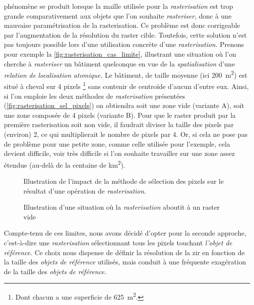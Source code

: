 phénomène se produit lorsque la maille utilisée pour la
\emph{rasterisation} est trop grande comparativement aux objets que
l'on souhaite \emph{rasteriser,} donc à une mauvaise paramétrisation
de la rasterisation. Ce problème est donc corrigeable par
l'augmentation de la résolution du raster cible. Toutefois, cette
solution n'est pas toujours possible lors d'une utilisation concrète
d'une \emph{rasterisation.} Prenons pour exemple la
\autoref{fig:rasterisation_cas_limite}, illustrant une situation où
l'on cherche à \emph{rasteriser} un bâtiment quelconque en vue de la
\emph{spatialisation} d'une \emph{relation de localisation atomique.}
Le bâtiment, de taille moyenne (ici \SI{200}{\metre\squared}) est
situé à cheval sur 4 pixels \footnote{Dont chacun a une superficie de
  \SI{625}{\metre\squared}.} sans contenir de centroïde d'aucun
d'entre eux. Ainsi, si l'on emploie les deux méthodes de
\emph{rasterisation} présentées
(\autoref{fig:rasterisation_sel_pixels}) on obtiendra soit une zone
vide (variante \textcolor{RdBu-9-1}{\textsf{A}}), soit une zone
composée de 4 pixels (variante \textcolor{RdBu-9-9}{\textsf{B}}). Pour
que le raster produit par la première rasterisation soit non vide, il
faudrait diviser la taille des pixels par (environ) 2, ce qui
multiplierait le nombre de pixels par 4. Or, si cela ne pose pas de
problème pour une petite zone, comme celle utilisée pour l'exemple,
cela devient difficile, voir très difficile si l'on souhaite
travailler sur une zone assez étendue (au-delà de la centaine de
\si{\kilo\meter\squared}).

\begin{figure}
  \centering
  
  \caption{Illustration de l'impact de la méthode de sélection des
    pixels sur le résultat d'une opération de \emph{rasterisation.}}
  \label{fig:rasterisation_sel_pixels}
\end{figure}

\begin{figure}
  \centering
  
  \caption{Illustration d'une situation où la \emph{rasterisation}
    aboutit à un raster vide}
  \label{fig:rasterisation_cas_limite}
\end{figure}

Compte-tenu de ces limites, nous avons décidé d'opter pour la seconde
approche, c'est-à-dire une \emph{rasterisation} sélectionnant tous les
pixels touchant \emph{l'objet de référence.} Ce choix nous dispense de
définir la résolution de la \ac{zir} en fonction de la taille des
\emph{objets de référence} utilisés, mais conduit à une fréquente
exagération de la taille des \emph{objets de référence.}

